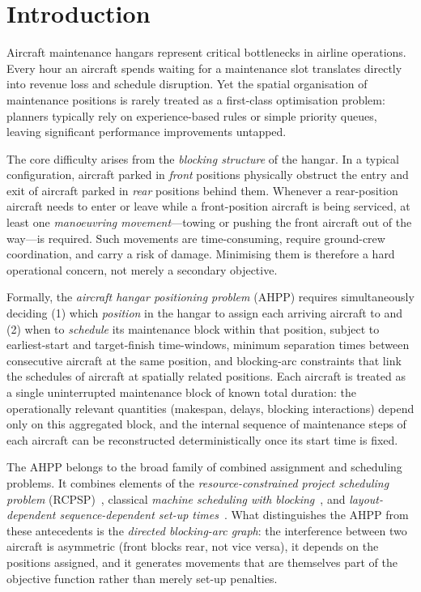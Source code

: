 \section{Introduction}
\label{sec:intro}

Aircraft maintenance hangars represent critical bottlenecks in airline
operations.  Every hour an aircraft spends waiting for a maintenance slot
translates directly into revenue loss and schedule disruption.  Yet the spatial
organisation of maintenance positions is rarely treated as a first-class
optimisation problem: planners typically rely on experience-based rules or
simple priority queues, leaving significant performance improvements untapped.

The core difficulty arises from the \emph{blocking structure} of the hangar.
In a typical configuration, aircraft parked in \emph{front} positions physically
obstruct the entry and exit of aircraft parked in \emph{rear} positions behind
them.  Whenever a rear-position aircraft needs to enter or leave while a
front-position aircraft is being serviced, at least one \emph{manoeuvring
movement}---towing or pushing the front aircraft out of the way---is required.
Such movements are time-consuming, require ground-crew coordination, and carry a
risk of damage.  Minimising them is therefore a hard operational concern, not
merely a secondary objective.

Formally, the \emph{aircraft hangar positioning problem} (AHPP) requires
simultaneously deciding (1) which \emph{position} in the hangar to assign
each arriving aircraft to and (2) when to \emph{schedule} its maintenance
block within that position, subject to earliest-start and target-finish
time-windows, minimum separation times between consecutive aircraft at the
same position, and blocking-arc constraints that link the schedules of
aircraft at spatially related positions.  Each aircraft is treated as a
single uninterrupted maintenance block of known total duration: the
operationally relevant quantities (makespan, delays, blocking interactions)
depend only on this aggregated block, and the internal sequence of
maintenance steps of each aircraft can be reconstructed deterministically
once its start time is fixed.

The AHPP belongs to the broad family of combined assignment and scheduling
problems.  It combines elements of the \emph{resource-constrained project
scheduling problem} (RCPSP)~\citep{Blazewicz1983}, classical
\emph{machine scheduling with blocking}~\citep{Hall1996}, and
\emph{layout-dependent sequence-dependent set-up times}~\citep{Pinedo2016}.
What distinguishes the AHPP from these antecedents is the
\emph{directed blocking-arc graph}: the interference between two aircraft is
asymmetric (front blocks rear, not vice versa), it depends on the positions
assigned, and it generates movements that are themselves part of the objective
function rather than merely set-up penalties.

